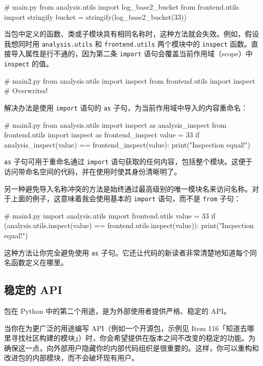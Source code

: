 \begin{codebox}[python]
# main.py
from analysis.utils import log_base2_bucket
from frontend.utils import stringify
bucket = stringify(log_base2_bucket(33))
\end{codebox}

当包中定义的函数、类或子模块具有相同名称时，这种方法就会失效。例如，假设我想同时用 \texttt{analysis.utils} 和 \texttt{frontend.utils} 两个模块中的 \texttt{inspect} 函数。直接导入属性是行不通的，因为第二条 \texttt{import} 语句会覆盖当前作用域（scope）中 \texttt{inspect} 的值。

\begin{codebox}[python]
# main2.py
from analysis.utils import inspect
from frontend.utils import inspect  # Overwrites!
\end{codebox}

解决办法是使用 \texttt{import} 语句的 \texttt{as} 子句，为当前作用域中导入的内容重命名：

\begin{codebox}[python]
# main3.py
from analysis.utils import inspect as analysis_inspect
from frontend.utils import inspect as frontend_inspect
value = 33
if analysis_inspect(value) == frontend_inspect(value):
    print("Inspection equal!")
\end{codebox}

\texttt{as} 子句可用于重命名通过 \texttt{import} 语句获取的任何内容，包括整个模块。这便于访问带命名空间的代码，并在使用时使其身份清晰明了。

另一种避免导入名称冲突的方法是始终通过最高级别的唯一模块名来访问名称。对于上面的例子，这意味着我会使用基本的 \texttt{import} 语句，而不是 \texttt{from} 子句：

\begin{codebox}[python]
# main4.py
import analysis.utils
import frontend.utils
value = 33
if (analysis.utils.inspect(value) ==
        frontend.utils.inspect(value)):
    print("Inspection equal!")
\end{codebox}

这种方法让你完全避免使用 \texttt{as} 子句。它还让代码的新读者非常清楚地知道每个同名函数定义在哪里。

\subsection{稳定的 API}

包在 Python 中的第二个用途，是为外部使用者提供严格、稳定的 API。

当你在为更广泛的用途编写 API（例如一个开源包，示例见 Item 116「知道去哪里寻找社区构建的模块」）时，你会希望提供在版本之间不改变的稳定的功能。为确保这一点，向外部用户隐藏你的内部代码组织是很重要的。这样，你可以重构和改进包的内部模块，而不会破坏现有用户。

